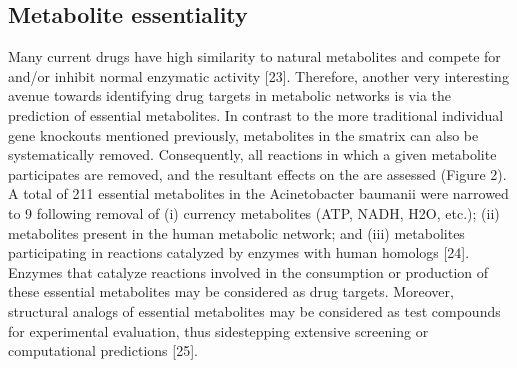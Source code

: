 \subsection{Metabolite essentiality}
Many current drugs have high similarity to natural metabolites and 
compete for and/or inhibit normal enzymatic activity [23]. Therefore, 
another very interesting avenue towards identifying drug targets 
in metabolic networks is via the prediction of essential metabolites. 
In contrast to the more traditional individual gene knockouts 
mentioned previously, metabolites in the \gls{smatrix} can also be 
systematically removed. Consequently, all reactions in which a 
given metabolite participates are removed, and the resultant 
effects on the  are assessed (Figure 2). A total of 
211 essential metabolites in the Acinetobacter baumanii 
 were narrowed to 9 following removal of (i) currency 
metabolites (ATP, NADH, H2O, etc.); (ii) metabolites present in 
the human metabolic network; and (iii) metabolites participating 
in reactions catalyzed by enzymes with human homologs [24]. 
Enzymes that catalyze reactions involved in the consumption or 
production of these essential metabolites may be considered 
as drug targets. Moreover, structural analogs of essential 
metabolites may be considered as test compounds for experimental 
evaluation, thus sidestepping extensive screening or 
computational predictions [25].

